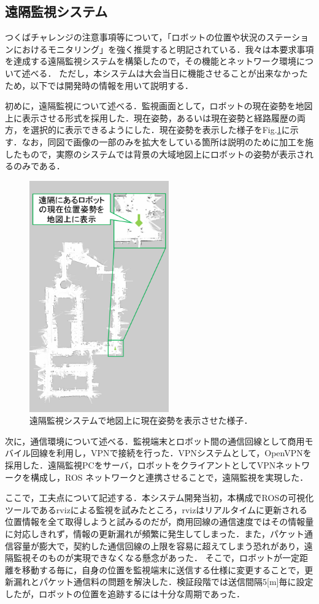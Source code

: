 \documentclass[10pt,a4paper]{jarticle}
\begin{document}
\subsection{遠隔監視システム}
つくばチャレンジの注意事項等について，「ロボットの位置や状況のステーションにおけるモニタリング」を強く推奨すると明記されている．我々は本要求事項を達成する遠隔監視システムを構築したので，その機能とネットワーク環境について述べる．
ただし，本システムは大会当日に機能させることが出来なかったため，以下では開発時の情報を用いて説明する．

初めに，遠隔監視について述べる．監視画面として，ロボットの現在姿勢を地図上に表示させる形式を採用した．現在姿勢，あるいは現在姿勢と経路履歴の両方，を選択的に表示できるようにした．現在姿勢を表示した様子をFig.\ref{monitor}に示す．なお，同図で画像の一部のみを拡大をしている箇所は説明のために加工を施したもので，実際のシステムでは背景の大域地図上にロボットの姿勢が表示されるのみである．
\begin{figure}
    \centering
    \includegraphics[width=6cm]{fig/png/monitor.png}
    \caption{遠隔監視システムで地図上に現在姿勢を表示させた様子．}
    \label{monitor}
\end{figure}

次に，通信環境について述べる．監視端末とロボット間の通信回線として商用モバイル回線を利用し，VPNで接続を行った．VPNシステムとして，OpenVPNを採用した．遠隔監視PCをサーバ，ロボットをクライアントとしてVPNネットワークを構成し，ROS ネットワークと連携させることで，遠隔監視を実現した．

ここで，工夫点について記述する．本システム開発当初，本構成でROSの可視化ツールであるrvizによる監視を試みたところ，rvizはリアルタイムに更新される位置情報を全て取得しようと試みるのだが，商用回線の通信速度ではその情報量に対応しきれず，情報の更新漏れが頻繁に発生してしまった．また，パケット通信容量が膨大で，契約した通信回線の上限を容易に超えてしまう恐れがあり，遠隔監視そのものが実現できなくなる懸念があった．
そこで，ロボットが一定距離を移動する毎に，自身の位置を監視端末に送信する仕様に変更することで，更新漏れとパケット通信料の問題を解決した．検証段階では送信間隔5[m]毎に設定したが，ロボットの位置を追跡するには十分な周期であった．
\end{document}
